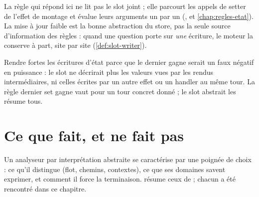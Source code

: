 
La règle qui répond ici ne lit pas le slot joint ; elle parcourt les appels de
setter de l'effet de montage et évalue leurs arguments un par un
(, et
\cref{chap:regles-etat}). La
mise à jour faible est la bonne abstraction du store, pas la seule source
d'information des règles : quand une question porte sur \emph{une} écriture,
le moteur la conserve à part, site par site (\cref{def:slot-writer}).

\begin{piege}
  Rendre fortes les écritures d'état \og parce que le dernier 
  gagne\fg{} serait un faux négatif en puissance : le slot ne décrirait plus
  les valeurs vues par les rendus intermédiaires, ni celles écrites par un
  autre effet ou un handler au même tour. La règle \og dernier set gagne\fg{}
  vaut pour un tour concret donné ; le slot abstrait les résume tous.
\end{piege}

\section{Ce que \reactant{} fait, et ne fait pas}
\label{sec:interpretation-abstraite-reactant}

Un analyseur par interprétation abstraite se caractérise par une poignée de
choix : ce qu'il distingue (flot, chemins, contextes), ce que ses domaines
savent exprimer, et comment il force la terminaison.
 résume ceux de \reactant{} ;
chacun a été rencontré dans ce chapitre.

